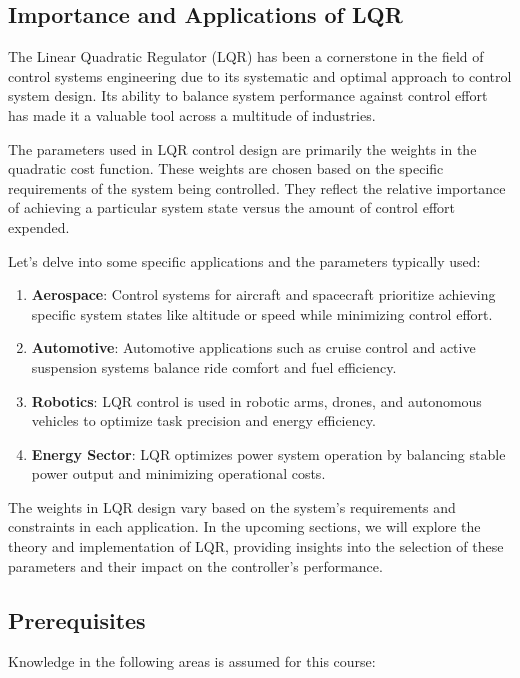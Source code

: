 \documentclass[11pt,twocolumn,twoside,lineno]{pnas-new}
\begin{document}
\subsection{Importance and Applications of LQR}
The Linear Quadratic Regulator (LQR) has been a cornerstone in the field of control systems engineering due to its systematic and optimal approach to control system design. Its ability to balance system performance against control effort has made it a valuable tool across a multitude of industries.

The parameters used in LQR control design are primarily the weights in the quadratic cost function. These weights are chosen based on the specific requirements of the system being controlled. They reflect the relative importance of achieving a particular system state versus the amount of control effort expended.

Let's delve into some specific applications and the parameters typically used:

\begin{enumerate}
       \item \textbf{Aerospace}: Control systems for aircraft and spacecraft prioritize achieving specific system states like altitude or speed while minimizing control effort.
       \item \textbf{Automotive}: Automotive applications such as cruise control and active suspension systems balance ride comfort and fuel efficiency.
       \item \textbf{Robotics}: LQR control is used in robotic arms, drones, and autonomous vehicles to optimize task precision and energy efficiency.
       \item \textbf{Energy Sector}: LQR optimizes power system operation by balancing stable power output and minimizing operational costs.
\end{enumerate}

The weights in LQR design vary based on the system's requirements and constraints in each application. In the upcoming sections, we will explore the theory and implementation of LQR, providing insights into the selection of these parameters and their impact on the controller's performance.

\subsection{Prerequisites}
Knowledge in the following areas is assumed for this course:
\end{document}
